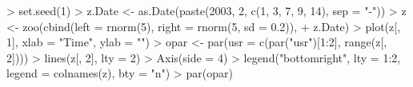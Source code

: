 \begin{Schunk}
\begin{Sinput}
> set.seed(1)
> z.Date <- as.Date(paste(2003, 2, c(1, 3, 7, 9, 14), sep = "-"))
> z <- zoo(cbind(left = rnorm(5), right = rnorm(5, sd = 0.2)), 
+     z.Date)
> plot(z[, 1], xlab = "Time", ylab = "")
> opar <- par(usr = c(par("usr")[1:2], range(z[, 2])))
> lines(z[, 2], lty = 2)
> Axis(side = 4)
> legend("bottomright", lty = 1:2, legend = colnames(z), bty = "n")
> par(opar)
\end{Sinput}
\end{Schunk}
